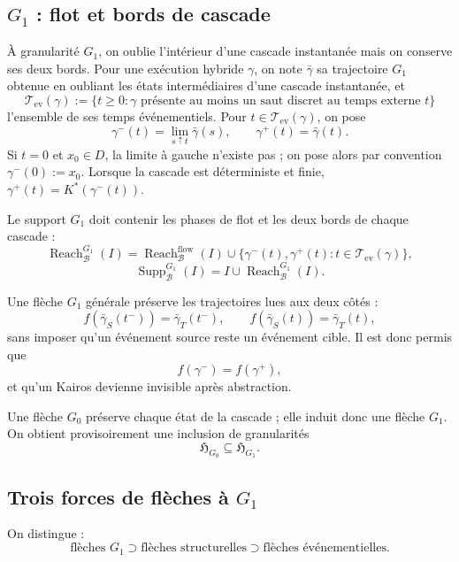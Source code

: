 \documentclass[11pt,a4paper]{article}
\theoremstyle{definition}
\theoremstyle{remark}
\newcommand{\Hyb}{\mathfrak H}
\newcommand{\Supp}{\operatorname{Supp}}
\newcommand{\Reach}{\operatorname{Reach}}
\begin{document}
\subsection{\texorpdfstring{$G_1$}{G1} : flot et bords de cascade}

À granularité $G_1$, on oublie l'intérieur d'une cascade instantanée mais on conserve ses deux bords. Pour une exécution hybride $\gamma$, on note $\bar\gamma$ sa trajectoire $G_1$ obtenue en oubliant les états intermédiaires d'une cascade instantanée, et
\[
\boxed{\mathcal T_{\mathrm{ev}}(\gamma):=\{t\geq0:\gamma\text{ présente au moins un saut discret au temps externe }t\}}
\]
l'ensemble de ses temps événementiels. Pour $t\in\mathcal T_{\mathrm{ev}}(\gamma)$, on pose
\[
\gamma^-(t)=\lim_{s\uparrow t}\bar\gamma(s),
\qquad
\gamma^+(t)=\bar\gamma(t).
\]
Si $t=0$ et $x_0\in D$, la limite à gauche n'existe pas ; on pose alors par convention $\gamma^-(0):=x_0$.
Lorsque la cascade est déterministe et finie, $\gamma^+(t)=K^*(\gamma^-(t))$.

Le support $G_1$ doit contenir les phases de flot et les deux bords de chaque cascade :
\[
\Reach^{G_1}_{\mathcal B}(I)
=
\Reach^{\mathrm{flow}}_{\mathcal B}(I)
\cup
\{\gamma^-(t),\gamma^+(t):t\in\mathcal T_{\mathrm{ev}}(\gamma)\},
\]
\[
\Supp^{G_1}_{\mathcal B}(I)=I\cup\Reach^{G_1}_{\mathcal B}(I).
\]

Une flèche $G_1$ générale préserve les trajectoires lues aux deux côtés :
\[
f(\bar\gamma_S(t^-))=\bar\gamma_T(t^-),
\qquad
f(\bar\gamma_S(t))=\bar\gamma_T(t),
\]
sans imposer qu'un événement source reste un événement cible. Il est donc permis que
\[
f(\gamma^-)=f(\gamma^+),
\]
et qu'un Kairos devienne invisible après abstraction.

Une flèche $G_0$ préserve chaque état de la cascade ; elle induit donc une flèche $G_1$. On obtient provisoirement une inclusion de granularités
\[
\Hyb_{G_0}\subseteq\Hyb_{G_1}.
\]

\subsection{Trois forces de flèches à \texorpdfstring{$G_1$}{G1}}

On distingue :
\[
\boxed{
\text{flèches }G_1
\supset
\text{flèches structurelles}
\supset
\text{flèches événementielles}.}
\]
\end{document}
